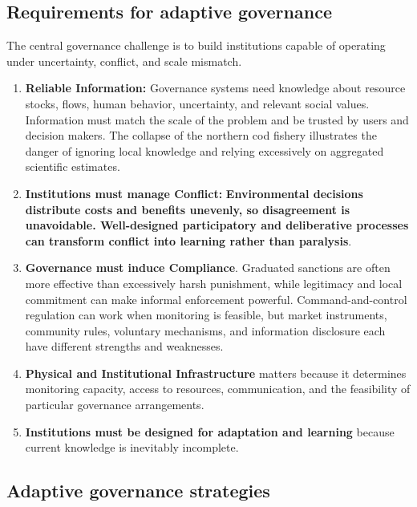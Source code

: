 \subsection{Requirements for adaptive governance}

The central governance challenge is to build institutions capable of operating under uncertainty, conflict, and scale mismatch.

\begin{enumerate}
    \item \textbf{Reliable Information:} Governance systems need knowledge about resource stocks, flows, human behavior, uncertainty, and relevant social values. Information must match the scale of the problem and be trusted by users and decision makers. The collapse of the northern cod fishery illustrates the danger of ignoring local knowledge and relying excessively on aggregated scientific estimates.
    
    \item \textbf{Institutions must manage Conflict: } \textbf{Environmental decisions distribute costs and benefits unevenly, so disagreement is unavoidable. Well-designed participatory and deliberative processes can transform conflict into learning rather than paralysis}.
    
    \item \textbf{Governance must induce Compliance}. Graduated sanctions are often more effective than excessively harsh punishment, while legitimacy and local commitment can make informal enforcement powerful. Command-and-control regulation can work when monitoring is feasible, but market instruments, community rules, voluntary mechanisms, and information disclosure each have different strengths and weaknesses.
    
    \item \textbf{Physical and Institutional Infrastructure} matters because it determines monitoring capacity, access to resources, communication, and the feasibility of particular governance arrangements.
    
    \item \textbf{Institutions must be designed for adaptation and learning} because current knowledge is inevitably incomplete.
\end{enumerate}

\subsection{Adaptive governance strategies}

